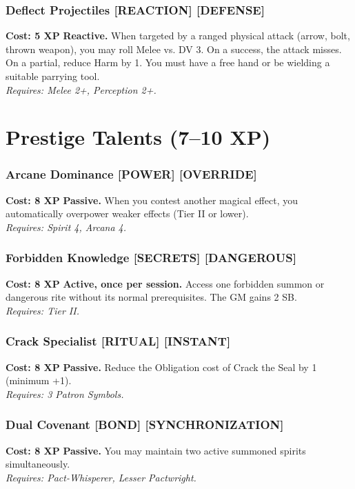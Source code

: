\subsubsection*{Deflect Projectiles \textnormal{[REACTION] [DEFENSE]}}
\label{talent:deflect-projectiles}
\textbf{Cost: 5 XP} \textbf{Reactive.} When targeted by a ranged physical attack (arrow, bolt, thrown weapon), you may roll Melee vs. DV 3. On a success, the attack misses. On a partial, reduce Harm by 1. You must have a free hand or be wielding a suitable parrying tool. \\
\textit{Requires: Melee 2+, Perception 2+.}

\section{Prestige Talents (7--10 XP)}
\label{sec:prestige-talents}

\subsubsection*{Arcane Dominance \textnormal{[POWER] [OVERRIDE]}}
\label{talent:arcane-dominance}
\textbf{Cost: 8 XP} \textbf{Passive.} When you contest another magical effect, you automatically overpower weaker effects (Tier II or lower). \\
\textit{Requires: Spirit 4, Arcana 4.}

\subsubsection*{Forbidden Knowledge \textnormal{[SECRETS] [DANGEROUS]}}
\label{talent:forbidden-knowledge}
\textbf{Cost: 8 XP} \textbf{Active, once per session.} Access one forbidden summon or dangerous rite without its normal prerequisites. The GM gains 2 SB. \\
\textit{Requires: Tier II.}

\subsubsection*{Crack Specialist \textnormal{[RITUAL] [INSTANT]}}
\label{talent:crack-specialist}
\textbf{Cost: 8 XP} \textbf{Passive.} Reduce the Obligation cost of Crack the Seal by 1 (minimum +1). \\
\textit{Requires: 3 Patron Symbols.}

\subsubsection*{Dual Covenant \textnormal{[BOND] [SYNCHRONIZATION]}}
\label{talent:dual-covenant}
\textbf{Cost: 8 XP} \textbf{Passive.} You may maintain two active summoned spirits simultaneously. \\
\textit{Requires: Pact-Whisperer, Lesser Pactwright.}

